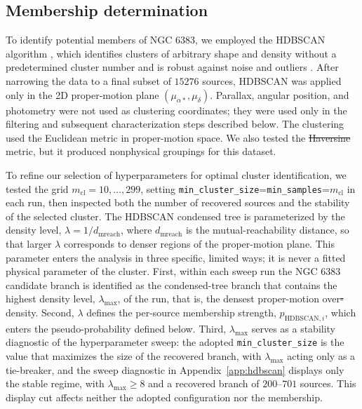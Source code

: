 \documentclass{aa}
\providecommand{\DIFaddtex}[1]{{\protect\color{red}\uwave{#1}}} %
\providecommand{\DIFdeltex}[1]{{\protect\color{red}\sout{#1}}} %
\providecommand{\DIFaddbegin}{} %
\providecommand{\DIFaddend}{} %
\providecommand{\DIFdelbegin}{} %
\providecommand{\DIFdelend}{} %
\providecommand{\DIFadd}[1]{\texorpdfstring{\DIFaddtex{#1}}{#1}} %
\providecommand{\DIFdel}[1]{\texorpdfstring{\DIFdeltex{#1}}{}} %
\providecommand{\DIFscaledelfig}{0.5}
\newlength{\DIFdelgraphicswidth} %
\newlength{\DIFdelgraphicsheight} %
\providecommand{\DIFaddincludegraphics}[2][]{{\color{blue}\fbox{\DIFOincludegraphics[#1]{#2}}}} %
\providecommand{\DIFdelincludegraphics}[2][]{%
\sbox{\DIFdelgraphicsbox}{\DIFOincludegraphics[#1]{#2}}%
\settoboxwidth{\DIFdelgraphicswidth}{\DIFdelgraphicsbox} %
\settoboxtotalheight{\DIFdelgraphicsheight}{\DIFdelgraphicsbox} %
\scalebox{\DIFscaledelfig}{%
\parbox[b]{\DIFdelgraphicswidth}{\usebox{\DIFdelgraphicsbox}\\[-\baselineskip] \rule{\DIFdelgraphicswidth}{0em}}\llap{\resizebox{\DIFdelgraphicswidth}{\DIFdelgraphicsheight}{%
\setlength{\unitlength}{\DIFdelgraphicswidth}%
\begin{picture}(1,1)%
\thicklines\linethickness{2pt} %
{\color[rgb]{1,0,0}\put(0,0){\framebox(1,1){}}}%
{\color[rgb]{1,0,0}\put(0,0){\line( 1,1){1}}}%
{\color[rgb]{1,0,0}\put(0,1){\line(1,-1){1}}}%
\end{picture}%
}\hspace*{3pt}}} %
} %
\DeclareRobustCommand{\DIFaddbegin}{\DIFOaddbegin \let\includegraphics\DIFaddincludegraphics} %
\DeclareRobustCommand{\DIFaddend}{\DIFOaddend \let\includegraphics\DIFOincludegraphics} %
\DeclareRobustCommand{\DIFdelbegin}{\DIFOdelbegin \let\includegraphics\DIFdelincludegraphics} %
\DeclareRobustCommand{\DIFdelend}{\DIFOaddend \let\includegraphics\DIFOincludegraphics} %
\begin{document}
\subsection{Membership determination}\label{subsubsec:membership}
To identify potential members of NGC 6383, we employed the HDBSCAN algorithm \citep{10.1007/978-3-642-37456-2_14,McInnes2017}, which identifies clusters of arbitrary shape and density without a predetermined cluster number and is robust against noise and outliers \citep{2021A&A...646A.104H}. After narrowing the data to a final subset of $15276$ sources, HDBSCAN was applied only in the 2D proper-motion plane $(\mu_{\alpha*},\mu_\delta)$. Parallax, angular position, and photometry were not used as clustering coordinates; they were used only in the filtering and subsequent characterization steps described below. The clustering used the Euclidean metric in proper-motion space. We also tested the \DIFdelbegin \DIFdel{Haversine }\DIFdelend \DIFaddbegin \DIFadd{haversine }\DIFaddend metric, but it produced nonphysical groupings for this dataset.

To refine our selection of hyperparameters for optimal cluster identification, we tested the grid $m_{\mathrm{cl}}=10,\ldots,299$, setting \texttt{min\_cluster\_size}=\texttt{min\_samples}=$m_{\mathrm{cl}}$ in each run, then inspected both the number of recovered sources and the stability of the selected cluster. The HDBSCAN condensed tree is parameterized by the density level, $\lambda=1/d_{\mathrm{mreach}}$, where $d_{\mathrm{mreach}}$ is the mutual-reachability distance, so that larger $\lambda$ corresponds to denser regions of the proper-motion plane. This parameter enters the analysis in three specific, limited ways; it is never a fitted physical parameter of the cluster. First, within each sweep run the NGC 6383 candidate branch is identified as the condensed-tree branch that contains the highest density level, $\lambda_{\mathrm{max}}$, of the run, that is, the densest proper-motion over\DIFdelbegin \DIFdel{-}\DIFdelend density. Second, $\lambda$ defines the per-source membership strength, $p_{\mathrm{HDBSCAN},i}$, which enters the pseudo-probability defined below. Third, $\lambda_{\mathrm{max}}$ serves as a stability diagnostic of the hyperparameter sweep: the adopted \texttt{min\_cluster\_size} is the value that maximizes the size of the recovered branch, with $\lambda_{\mathrm{max}}$ acting only as a tie-breaker, and the sweep diagnostic in Appendix~\ref{app:hdbscan} displays only the stable regime, with $\lambda_{\mathrm{max}}\geq8$ and a recovered branch of $200$--$701$ sources. This display cut affects neither the adopted configuration nor the membership.
\end{document}
